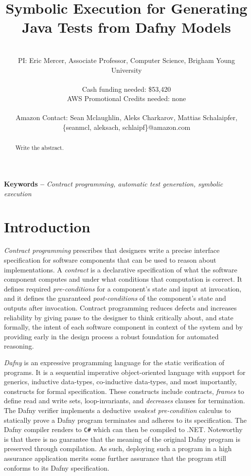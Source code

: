 \documentclass[11pt,onecolumn,notitlepage]{article}
\makeatletter
\renewcommand{\maketitle}{\bgroup\setlength{\parindent}{0pt}
\begin{flushleft}
  \Large{\textbf{\@title}}
  
  \normalsize{\@author}
\end{flushleft}\egroup
}
\makeatother
\begin{document}
\title{Symbolic Execution for Generating Java Tests from Dafny Models}
\author{\hfill \\
        PI: Eric Mercer, Associate Professor, Computer Science, Brigham Young University\\
        \hfill \\
        Cash funding needed: \$53,420 \\
        AWS Promotional Credits needed: none\\
        \hfill \\
        Amazon Contact: Sean Mclaughlin, Aleks Charkarov, Mattias Schalaipfer, \{seanmcl, aleksach, schlaipf\}@amazon.com}

\maketitle

\begin{abstract}
  Write the abstract.
\end{abstract}

\providecommand{\keywords}[1]{\noindent\textbf{Keywords -- } \textit{#1}}
\keywords{Contract programming, automatic test generation, symbolic execution}

\section*{Introduction}
\emph{Contract programming} prescribes that designers write a precise interface specification for software components that can be used to reason about implementations. A \emph{contract} is a declarative specification of what the software component computes and under what conditions that computation is correct. It defines required \emph{pre-conditions} for a component's state and input at invocation, and it defines the guaranteed \emph{post-conditions} of the component's state and outputs after invocation. Contract programming reduces defects and increases reliability by giving pause to the designer to think critically about, and state formally, the intent of each software component in context of the system and by providing early in the design process a robust foundation for automated reasoning. 

\emph{Dafny} is an expressive programming language for the static verification of programs. It is a sequential imperative object-oriented language with support for generics, inductive data-types, co-inductive data-types, and most importantly, constructs for formal specification. These constructs include contracts, \emph{frames} to define read and write sets, loop-invariants, and \emph{decreases} clauses for termination. The Dafny verifier implements a deductive \emph{weakest pre-condition} calculus to statically prove a Dafny program terminates and adheres to its specification. The Dafny compiler renders to \texttt{C\#} which can then be compiled to .NET. Noteworthy is that there is no guarantee that the meaning of the original Dafny program is preserved through compilation. As such, deploying such a program in a high assurance application merits some further assurance that the program still conforms to its Dafny specification.  
\end{document}
